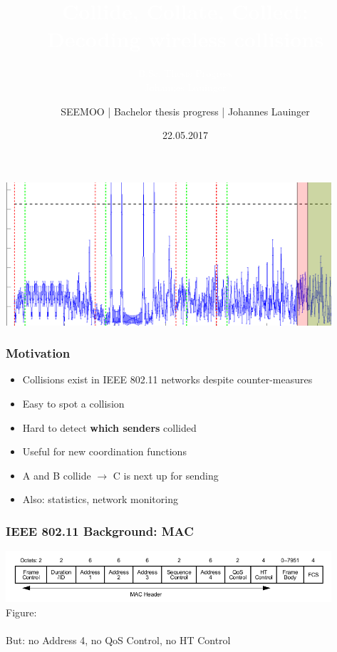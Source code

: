 \documentclass[accentcolor=tud8b,colorbacktitle]{tudbeamer}
\title{\textcolor{white}{Collide, Collate, Collect:\\Decoding wireless collisions\\}}
\subtitle{\textcolor{white}{B.Sc. Thesis Progress\\Johannes Lauinger}}
\author{SEEMOO | Bachelor thesis progress | Johannes Lauinger}
\date{22.05.2017}
\begin{document}
\begin{titleframe}
	\includegraphics[width=12.1cm]{assets/title-image}
\end{titleframe}


\begin{frame}
\frametitle{Motivation}
\begin{itemize}
	\setlength\itemsep{1em}
	\item Collisions exist in IEEE 802.11 networks despite counter-measures
	\item Easy to spot a collision
	\item Hard to detect \textbf{which senders} collided
	\item Useful for new coordination functions
	\item A and B collide $\rightarrow$ C is next up for sending
	\item Also: statistics, network monitoring
\end{itemize}
\end{frame}


\begin{frame}
\frametitle{IEEE 802.11 Background: MAC}
\begin{center}
	\includegraphics[width=12.1cm]{assets/mac-format}\\
	\small Figure: \cite{ieee2012} \normalsize\\~\\
	But: no Address 4, no QoS Control, no HT Control
\end{center}
\end{frame}
\end{document}
